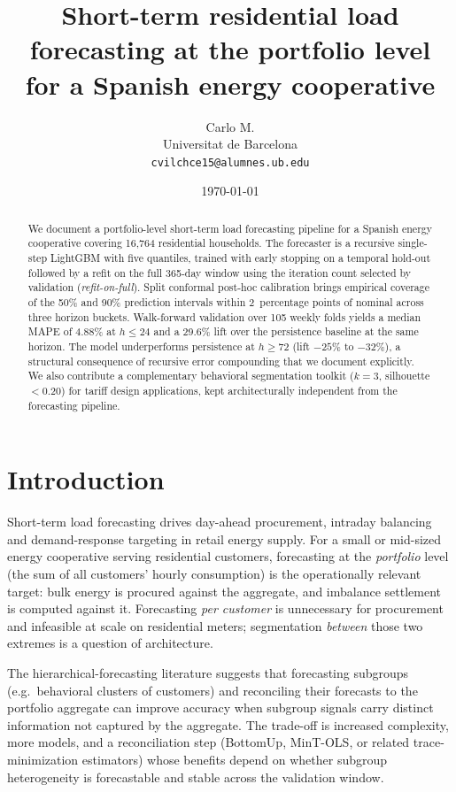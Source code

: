 \documentclass[11pt]{article}
\title{Short-term residential load forecasting at the portfolio level\\
       for a Spanish energy cooperative}
\author{Carlo M.\\ Universitat de Barcelona\\ \texttt{cvilchce15@alumnes.ub.edu}}
\date{\today}
\begin{document}
\maketitle

\begin{abstract}
\noindent
We document a portfolio-level short-term load forecasting pipeline for a
Spanish energy cooperative covering 16,764 residential households. The
forecaster is a recursive single-step LightGBM with five quantiles, trained
with early stopping on a temporal hold-out followed by a refit on the full
365-day window using the iteration count selected by validation
(\emph{refit-on-full}). Split conformal post-hoc calibration brings
empirical coverage of the 50\% and 90\% prediction intervals within
2~percentage points of nominal across three horizon buckets. Walk-forward
validation over 105 weekly folds yields a median MAPE of 4.88\% at
$h \leq 24$ and a 29.6\% lift over the persistence baseline at the same
horizon. The model underperforms persistence at $h \geq 72$
(lift $-25\%$ to $-32\%$), a structural consequence of recursive error
compounding that we document explicitly. We also contribute a complementary
behavioral segmentation toolkit ($k = 3$, silhouette $< 0.20$) for tariff
design applications, kept architecturally independent from the forecasting
pipeline.
\end{abstract}

\section{Introduction}

Short-term load forecasting drives day-ahead procurement, intraday balancing
and demand-response targeting in retail energy supply. For a small or
mid-sized energy cooperative serving residential customers, forecasting at
the \emph{portfolio} level (the sum of all customers' hourly consumption)
is the operationally relevant target: bulk energy is procured against the
aggregate, and imbalance settlement is computed against it. Forecasting
\emph{per customer} is unnecessary for procurement and infeasible at scale
on residential meters; segmentation \emph{between} those two extremes is a
question of architecture.

The hierarchical-forecasting literature \citep{wickramasuriya2019,
hyndman2021} suggests that forecasting subgroups (e.g.\ behavioral clusters
of customers) and reconciling their forecasts to the portfolio aggregate
can improve accuracy when subgroup signals carry distinct information not
captured by the aggregate. The trade-off is increased complexity, more
models, and a reconciliation step (BottomUp, MinT-OLS, or related
trace-minimization estimators) whose benefits depend on whether subgroup
heterogeneity is forecastable and stable across the validation window.
\end{document}
